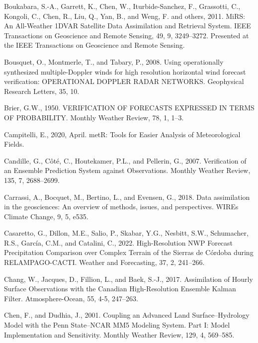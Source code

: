 \documentclass[12pt,oneside,a4paper]{reedthesis}
\begin{document}
\leavevmode\hypertarget{ref-boukabara2011}{}%
Boukabara, S.-A., Garrett, K., Chen, W., Iturbide-Sanchez, F., Grassotti, C., Kongoli, C., Chen, R., Liu, Q., Yan, B., and Weng, F. and others, 2011. MiRS: An All-Weather 1DVAR Satellite Data Assimilation and Retrieval System. IEEE Transactions on Geoscience and Remote Sensing, 49, 9, 3249--3272. Presented at the IEEE Transactions on Geoscience and Remote Sensing.

\leavevmode\hypertarget{ref-bousquet2008}{}%
Bousquet, O., Montmerle, T., and Tabary, P., 2008. Using operationally synthesized multiple-Doppler winds for high resolution horizontal wind forecast verification: OPERATIONAL DOPPLER RADAR NETWORKS. Geophysical Research Letters, 35, 10.

\leavevmode\hypertarget{ref-brier1950}{}%
Brier, G.W., 1950. VERIFICATION OF FORECASTS EXPRESSED IN TERMS OF PROBABILITY. Monthly Weather Review, 78, 1, 1--3.

\leavevmode\hypertarget{ref-campitelli2020}{}%
Campitelli, E., 2020, April. metR: Tools for Easier Analysis of Meteorological Fields.

\leavevmode\hypertarget{ref-candille2007}{}%
Candille, G., Côté, C., Houtekamer, P.L., and Pellerin, G., 2007. Verification of an Ensemble Prediction System against Observations. Monthly Weather Review, 135, 7, 2688--2699.

\leavevmode\hypertarget{ref-carrassi2018}{}%
Carrassi, A., Bocquet, M., Bertino, L., and Evensen, G., 2018. Data assimilation in the geosciences: An overview of methods, issues, and perspectives. WIREs Climate Change, 9, 5, e535.

\leavevmode\hypertarget{ref-casaretto2022}{}%
Casaretto, G., Dillon, M.E., Salio, P., Skabar, Y.G., Nesbitt, S.W., Schumacher, R.S., García, C.M., and Catalini, C., 2022. High-Resolution NWP Forecast Precipitation Comparison over Complex Terrain of the Sierras de Córdoba during RELAMPAGO-CACTI. Weather and Forecasting, 37, 2, 241--266.

\leavevmode\hypertarget{ref-chang2017}{}%
Chang, W., Jacques, D., Fillion, L., and Baek, S.-J., 2017. Assimilation of Hourly Surface Observations with the Canadian High-Resolution Ensemble Kalman Filter. Atmosphere-Ocean, 55, 4-5, 247--263.

\leavevmode\hypertarget{ref-chen2001}{}%
Chen, F., and Dudhia, J., 2001. Coupling an Advanced Land Surface--Hydrology Model with the Penn State--NCAR MM5 Modeling System. Part I: Model Implementation and Sensitivity. Monthly Weather Review, 129, 4, 569--585.
\end{document}
